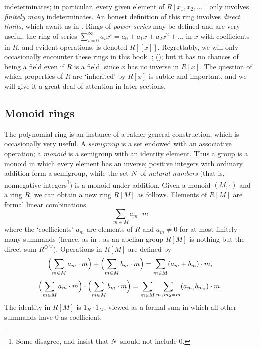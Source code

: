indeterminates; in particular, every given element of
$R[x_1, x_2, \ldots]$ only involves \emph{finitely many}
indeterminates. An honest definition of this ring involves
\emph{direct limits}, which await us in
.  Rings of \emph{power
  series} may be defined and are very useful; the ring of series
$\sum_{i=0}^{\infty} a_i x^i = a_0 + a_1 x + a_2 x^2 + \ldots$ in $x$
with coefficients in $R$, and evident operations, is denoted
$R[[x]]$. Regrettably, we will only occasionally encounter these rings
in this book.  ; 
(); but it has no chances of being
a field even if $R$ is a field, since $x$ has no inverse in
$R[x]$. The question of which properties of $R$ are `inherited' by
$R[x]$ is subtle and important, and we will give it a great deal of
attention in later sections.

\subsection{Monoid rings}
\label{subsec:rings:monoid-rings}
The polynomial ring is an instance of a rather general construction,
which is occasionally very useful. A \emph{semigroup} is a set endowed
with an associative operation; a \emph{monoid} is a semigroup with an
identity element. Thus a group is a monoid in which every element has
an inverse; positive integers with ordinary addition form a semigroup,
while the set $N$ of \emph{natural numbers} (that is, nonnegative
integers\footnote{Some disagree, and insist that $N$ should not
  include $0$.}) is a monoid under addition.  Given a monoid
$(M, \cdot)$ and a ring $R$, we can obtain a new ring $R[M]$ as
follows.  Elements of $R[M]$ are formal linear combinations
\[
  \sum_{m \in M} a_m \cdot m
\]
where the `coefficients' $a_m$ are elements of $R$ and $a_m \neq 0$
for at most finitely many summands (hence, as in
, as an abelian group $R[M]$ is
nothing but the direct sum $R^{\oplus M}$). Operations in $R[M]$ are
defined by
\[
  \Bigl(\sum_{m \in M} a_m \cdot m\Bigr) + \Bigl(\sum_{m \in M} b_m
  \cdot m\Bigr) = \sum_{m \in M} (a_m + b_m) \cdot m,
\]
\[
  \Bigl(\sum_{m \in M} a_m \cdot m\Bigr) \cdot \Bigl(\sum_{m \in M}
  b_m \cdot m\Bigr) = \sum_{m \in M} \sum_{m_1 m_2 = m} (a_{m_1}
  b_{m_2}) \cdot m.
\]
The identity in $R[M]$ is $1_R \cdot 1_M$, viewed as a formal sum in
which all other summands have $0$ as coefficient.

